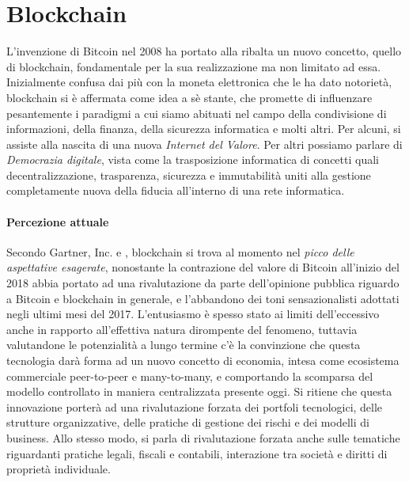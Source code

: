 \section{Blockchain}\label{sec:introduzione}
	L'invenzione di Bitcoin nel 2008 ha portato alla ribalta un nuovo concetto, quello di blockchain, fondamentale per la sua realizzazione ma non limitato ad essa. Inizialmente confusa dai più con la moneta elettronica che le ha dato notorietà,  blockchain si è affermata come idea a sè stante, che promette di influenzare pesantemente i paradigmi a cui siamo abituati nel campo della condivisione di informazioni, della finanza, della sicurezza informatica e molti altri. Per alcuni, si assiste alla nascita di una nuova \emph{Internet del Valore}. Per altri possiamo parlare di \emph{Democrazia digitale}, vista come la trasposizione informatica di concetti quali decentralizzazione, trasparenza, sicurezza e immutabilità uniti alla gestione completamente nuova della fiducia all'interno di una rete informatica.

	\paragraph{Percezione attuale} Secondo Gartner, Inc.\cite{gartner} e \cite{gartner_march}, blockchain si trova al momento nel \emph{picco delle aspettative esagerate}, nonostante la contrazione del valore di Bitcoin all'inizio del 2018 abbia portato ad una rivalutazione da parte dell'opinione pubblica riguardo a Bitcoin e blockchain in generale, e l'abbandono dei toni sensazionalisti adottati negli ultimi mesi del 2017. L'entusiasmo è spesso stato ai limiti dell'eccessivo anche in rapporto all'effettiva natura dirompente del fenomeno, tuttavia valutandone le potenzialità a lungo termine c'è la convinzione che questa tecnologia darà forma ad un nuovo concetto di economia, intesa come ecosistema commerciale peer-to-peer e many-to-many, e comportando la scomparsa del modello controllato in maniera centralizzata presente oggi. Si ritiene che questa innovazione porterà ad una rivalutazione forzata dei portfoli tecnologici, delle strutture organizzative, delle pratiche di gestione dei rischi e dei modelli di business. Allo stesso modo, si parla di rivalutazione forzata anche sulle tematiche riguardanti pratiche legali, fiscali e contabili, interazione tra società e diritti di proprietà individuale.
	
